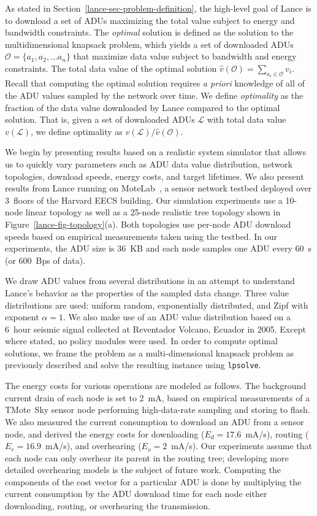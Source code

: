 As stated in Section~\ref{lance-sec-problem-definition}, the high-level goal
of Lance is to download a set of ADUs maximizing the total value subject to
energy and bandwidth constraints. The \textit{optimal} solution is defined as
the solution to the multidimensional knapsack problem, which yields a set of
downloaded ADUs $\mathcal{O} = \{a_1, a_2, ... a_n\}$ that maximize data
value subject to bandwidth and energy constraints. The total data value of
the optimal solution $\hat{v}(\mathcal{O}) = \sum_{a_i \in \mathcal{O}} v_i$.
Recall that computing the optimal solution requires \textit{a priori}
knowledge of all of the ADU values sampled by the network over time. We
define \textit{optimality} as the fraction of the data value downloaded by
Lance compared to the optimal solution. That is, given a set of downloaded
ADUs $\mathcal{L}$ with total data value $v(\mathcal{L})$, we define
optimality as $v(\mathcal{L}) / \hat{v}(\mathcal{O})$.

We begin by presenting results based on a realistic system simulator that
allows us to quickly vary parameters such as ADU data value distribution,
network topologies, download speeds, energy costs, and target lifetimes. We
also present results from Lance running on MoteLab~\cite{motelab}, a sensor
network testbed deployed over 3~floors of the Harvard EECS building. Our
simulation experiments use a 10-node linear topology as well as a 25-node
realistic tree topology shown in Figure~\ref{lance-fig-topology}(a).
Both topologies use per-node ADU download speeds based on empirical
measurements taken using the testbed. In our experiments, the ADU size is
36~KB and each node samples one ADU every 60~s (or 600~Bps of data).

We draw ADU values from several distributions in an attempt to understand
Lance's behavior as the properties of the sampled data change. Three value
distributions are used: uniform random, exponentially distributed, and Zipf
with exponent $\alpha = 1$. We also make use of an ADU value distribution
based on a 6~hour seismic signal collected at Reventador Volcano, Ecuador in
2005. Except where stated, no policy modules were used. In order to compute
optimal solutions, we frame the problem as a multi-dimensional knapsack
problem as previously described and solve the resulting instance using
\texttt{lpsolve}.

The energy costs for various operations are modeled as follows. The
background current drain of each node is set to 2~mA, based on empirical
measurements of a TMote~Sky sensor node performing high-data-rate sampling
and storing to flash. We also measured the current consumption to download an
ADU from a sensor node, and derived the energy costs for downloading ($E_d =
17.6$~mA/s), routing ($E_r = 16.9$~mA/s), and overhearing ($E_o = 2$~mA/s).
Our experiments assume that each node can only overhear its parent in the
routing tree; developing more detailed overhearing models is the subject of
future work. Computing the components of the cost vector for a particular ADU
is done by multiplying the current consumption by the ADU download time for
each node either downloading, routing, or overhearing the transmission.

